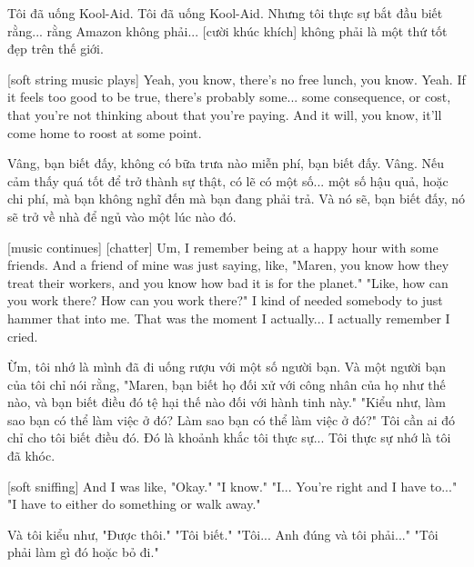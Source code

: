 \documentclass[a4paper]{article}
\begin{document}
	\begin{vietnamese-v2}
		Tôi đã uống Kool-Aid. Tôi đã uống Kool-Aid.
		Nhưng tôi thực sự bắt đầu biết rằng... rằng Amazon không phải... [cười khúc khích] không phải là một thứ tốt đẹp trên thế giới.
	\end{vietnamese-v2}
	
	[soft string music plays]
	Yeah, you know, there's no free lunch, you know. Yeah.
	If it feels too good to be true, there's probably some... some consequence, or cost, that you're not thinking about that you're paying. And it will, you know, it'll come home to roost at some point.
	
	\begin{vietnamese-v2}
		Vâng, bạn biết đấy, không có bữa trưa nào miễn phí, bạn biết đấy. Vâng.
		Nếu cảm thấy quá tốt để trở thành sự thật, có lẽ có một số... một số hậu quả, hoặc chi phí, mà bạn không nghĩ đến mà bạn đang phải trả. Và nó sẽ, bạn biết đấy, nó sẽ trở về nhà để ngủ vào một lúc nào đó.
	\end{vietnamese-v2}
	
	[music continues]
	[chatter]
	Um, I remember being at a happy hour with some friends.
	And a friend of mine was just saying, like, "Maren, you know how they treat their workers, and you know how bad it is for the planet."
	"Like, how can you work there? How can you work there?"
	I kind of needed somebody to just hammer that into me.
	That was the moment I actually... I actually remember I cried.
	
	\begin{vietnamese-v2}
		Ừm, tôi nhớ là mình đã đi uống rượu với một số người bạn.
		Và một người bạn của tôi chỉ nói rằng, "Maren, bạn biết họ đối xử với công nhân của họ như thế nào, và bạn biết điều đó tệ hại thế nào đối với hành tinh này."
		"Kiểu như, làm sao bạn có thể làm việc ở đó? Làm sao bạn có thể làm việc ở đó?"
		Tôi cần ai đó chỉ cho tôi biết điều đó.
		Đó là khoảnh khắc tôi thực sự... Tôi thực sự nhớ là tôi đã khóc.
	\end{vietnamese-v2}
	
	[soft sniffing]
	And I was like, "Okay."
	"I know."
	"I... You're right and I have to..."
	"I have to either do something or walk away."
	
	\begin{vietnamese-v2}
		Và tôi kiểu như, "Được thôi."
		"Tôi biết."
		"Tôi... Anh đúng và tôi phải..."
		"Tôi phải làm gì đó hoặc bỏ đi."
	\end{vietnamese-v2}
	
\end{document}
